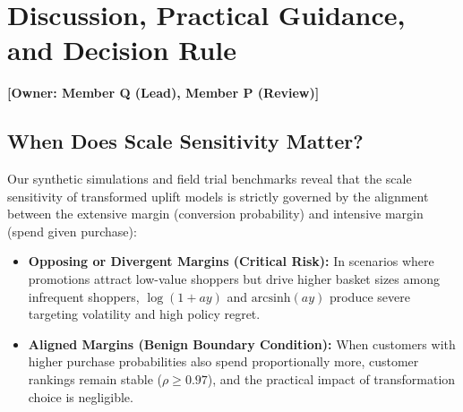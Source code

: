 \documentclass[11pt,a4paper]{article}
\begin{document}
\section{Discussion, Practical Guidance, and Decision Rule}
\label{sec:discussion}
\noindent \textbf{[Owner: Member Q (Lead), Member P (Review)]}

\subsection{When Does Scale Sensitivity Matter?}
Our synthetic simulations and field trial benchmarks reveal that the scale sensitivity of transformed uplift models is strictly governed by the alignment between the extensive margin (conversion probability) and intensive margin (spend given purchase):
\begin{itemize}
    \item \textbf{Opposing or Divergent Margins (Critical Risk):} In scenarios where promotions attract low-value shoppers but drive higher basket sizes among infrequent shoppers, $\log(1+ay)$ and $\text{arcsinh}(ay)$ produce severe targeting volatility and high policy regret.
    \item \textbf{Aligned Margins (Benign Boundary Condition):} When customers with higher purchase probabilities also spend proportionally more, customer rankings remain stable ($\rho \ge 0.97$), and the practical impact of transformation choice is negligible.
\end{itemize}
\end{document}

